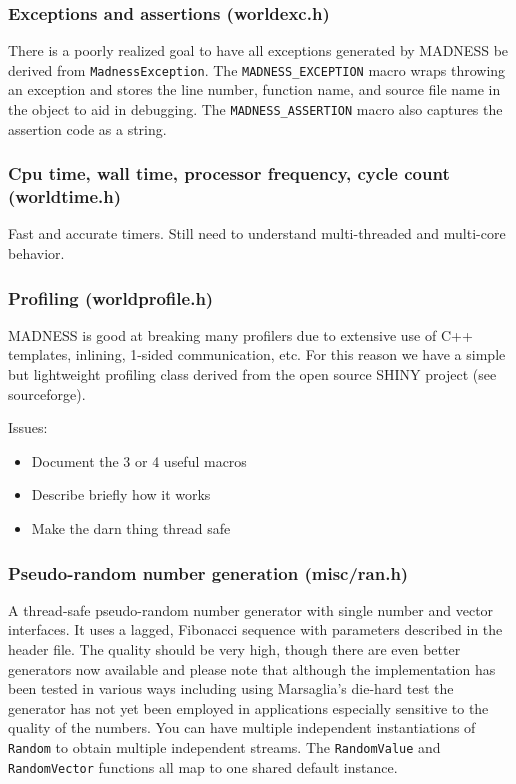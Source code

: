 \documentclass[letterpaper]{article}
\newcommand\liststyleLii{%
\renewcommand\labelitemi{${\bullet}$}
\renewcommand\labelitemii{${\circ}$}
\renewcommand\labelitemiii{${\blacksquare}$}
\renewcommand\labelitemiv{${\bullet}$}
}
\begin{document}
\subsubsection{Exceptions and assertions (worldexc.h)}
There is a poorly realized goal to have all exceptions generated by MADNESS be derived from \texttt{MadnessException}.
The \texttt{MADNESS\_EXCEPTION} macro wraps throwing an exception and stores the line number, function name, and source
file name in the object to aid in debugging. The \texttt{MADNESS\_ASSERTION} macro also captures the assertion code as
a string.

\subsubsection{Cpu time, wall time, processor frequency, cycle count (worldtime.h)}
Fast and accurate timers. Still need to understand multi-threaded and multi-core behavior.

\subsubsection{Profiling (worldprofile.h)}
MADNESS is good at breaking many profilers due to extensive use of C++ templates, inlining, 1-sided communication, etc.
For this reason we have a simple but lightweight profiling class derived from the open source SHINY project (see
sourceforge).

Issues:

\liststyleLii
\begin{itemize}
\item Document the 3 or 4 useful macros
\item Describe briefly how it works
\item Make the darn thing thread safe
\end{itemize}
\subsubsection{Pseudo-random number generation (misc/ran.h)}
A thread-safe pseudo-random number generator with single number and vector interfaces. It uses a lagged, Fibonacci
sequence with parameters described in the header file. The quality should be very high, though there are even better
generators now available and please note that although the implementation has been tested in various ways including
using Marsaglia's die-hard test the generator has not yet been employed in applications especially sensitive to the
quality of the numbers. You can have multiple independent instantiations of \texttt{Random} to obtain multiple
independent streams. The \texttt{RandomValue} and \texttt{RandomVector} functions all map to one shared default
instance.
\end{document}
